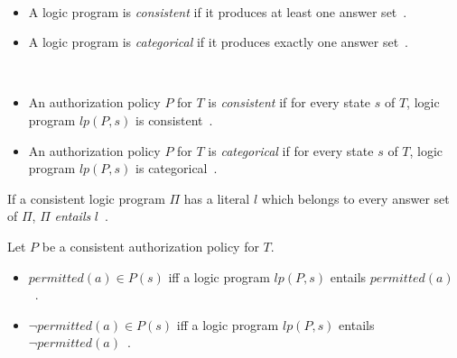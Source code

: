 \begin{definition}
    \label{def:lp_consistent}
    \label{def:lp_categorical}
    ~

    \begin{itemize}
        \item A logic program is \textit{consistent} if it produces at least one answer set~\citep{gelfond_authorization_2008}.
        \item A logic program is \textit{categorical} if it produces exactly one answer set~\citep{gelfond_authorization_2008}.
    \end{itemize}
\end{definition}

\begin{definition}
    \label{def:authorization_consistent}
    \label{def:authorization_categorical}
    ~

    \begin{itemize}
        \item An authorization policy $P$ for $T$ is \textit{consistent} if for every state $s$ of $T$, logic program $lp(P, s)$ is consistent~\citep{gelfond_authorization_2008}.
        \item An authorization policy $P$ for $T$ is \textit{categorical} if for every state $s$ of $T$, logic program $lp(P, s)$ is categorical~\citep{gelfond_authorization_2008}.
    \end{itemize}
\end{definition}

\begin{definition}
    \label{def:entails}
    If a consistent logic program $\Pi$ has a literal $l$ which belongs to every answer set of $\Pi$, $\Pi$ \textit{entails} $l$~\citep{gelfond_authorization_2008}.
\end{definition}

\begin{definition}
    Let $P$ be a consistent authorization policy for $T$.

    \begin{itemize}
        \item $permitted(a) \in P(s)$ iff a logic program $lp(P, s)$ entails $permitted(a)$~\citep{gelfond_authorization_2008}.
        \item $\neg permitted(a) \in P(s)$ iff a logic program $lp(P, s)$ entails $\neg permitted(a)$~\citep{gelfond_authorization_2008}.
    \end{itemize}
\end{definition}

